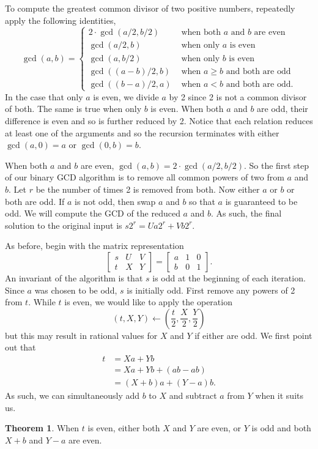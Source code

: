 \documentclass{ucalgthes1}
\theoremstyle{definition}
\newtheorem{thm}{Theorem}[section]
\newcommand{\matrixThreeTwo}[6]{\left[ \begin{array}{rrr} #1 & #2 & #3 \\ #4 & #5 & #6 \end{array} \right]}
\begin{document}
To compute the greatest common divisor of two positive numbers, repeatedly apply the following identities,
\[
	\gcd(a, b) = \begin{cases}
		2 \cdot \gcd(a/2, b/2) & \textrm{ when both $a$ and $b$ are even} \\
		\gcd(a/2, b) & \textrm{ when only $a$ is even} \\
		\gcd(a, b/2) & \textrm{ when only $b$ is even} \\
		\gcd((a-b)/2, b) & \textrm{ when $a \ge b$ and both are odd} \\
		\gcd((b-a)/2, a) & \textrm{ when $a < b$ and both are odd}.
	\end{cases}
\]
In the case that only $a$ is even, we divide $a$ by 2 since 2 is not a common divisor of both.  The same is true when only $b$ is even.  When both $a$ and $b$ are odd, their difference is even and so is further reduced by 2.  Notice that each relation reduces at least one of the arguments and so the recursion terminates with either $\gcd(a, 0) = a$ or $\gcd(0, b) = b$.

When both $a$ and $b$ are even, $\gcd(a, b) = 2 \cdot \gcd(a/2, b/2)$.  So the first step of our binary GCD algorithm is to remove all common powers of two from $a$ and $b$.  Let $r$ be the number of times 2 is removed from both.  Now either $a$ or $b$ or both are odd.  If $a$ is not odd, then swap $a$ and $b$ so that $a$ is guaranteed to be odd.  We will compute the GCD of the reduced $a$ and $b$.  As such, the final solution to the original input is $s2^r = Ua2^r + Vb2^r$.

As before, begin with the matrix representation
\[
	\matrixThreeTwo{s}{U}{V}{t}{X}{Y} = \matrixThreeTwo{a}{1}{0}{b}{0}{1}.
\]
An invariant of the algorithm is that $s$ is odd at the beginning of each iteration.  Since $a$ was chosen to be odd, $s$ is initially odd.  First remove any powers of 2 from $t$.  While $t$ is even, we would like to apply the operation
\[
(t, X, Y) \gets \left( \frac{t}{2}, \frac{X}{2}, \frac{Y}{2} \right)
\]
but this may result in rational values for $X$ and $Y$ if either are odd. We first point out that
\begin{align*}
	t &= Xa + Yb \\
	  &= Xa + Yb + (ab - ab) \\
	  &= (X+b)a + (Y-a)b.
\end{align*}
As such, we can simultaneously add $b$ to $X$ and subtract $a$ from $Y$ when it suits us.

\begin{thm}
\label{thm:addBSubA}
When $t$ is even, either both $X$ and $Y$ are even, or $Y$ is odd and both $X+b$ and $Y-a$ are even.
\end{thm}
\end{document}
